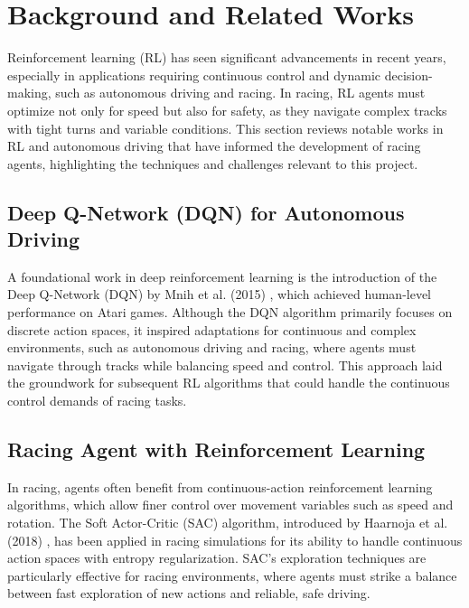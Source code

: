 \documentclass{article}
\begin{document}
\section{Background and Related Works}

Reinforcement learning (RL) has seen significant advancements in recent years, especially in applications requiring continuous control and dynamic decision-making, such as autonomous driving and racing. In racing, RL agents must optimize not only for speed but also for safety, as they navigate complex tracks with tight turns and variable conditions. This section reviews notable works in RL and autonomous driving that have informed the development of racing agents, highlighting the techniques and challenges relevant to this project.

\subsection{Deep Q-Network (DQN) for Autonomous Driving}
A foundational work in deep reinforcement learning is the introduction of the Deep Q-Network (DQN) by Mnih et al. (2015) \cite{mnih2015human}, which achieved human-level performance on Atari games. Although the DQN algorithm primarily focuses on discrete action spaces, it inspired adaptations for continuous and complex environments, such as autonomous driving and racing, where agents must navigate through tracks while balancing speed and control. This approach laid the groundwork for subsequent RL algorithms that could handle the continuous control demands of racing tasks.

\subsection{Racing Agent with Reinforcement Learning}
In racing, agents often benefit from continuous-action reinforcement learning algorithms, which allow finer control over movement variables such as speed and rotation. The Soft Actor-Critic (SAC) algorithm, introduced by Haarnoja et al. (2018) \cite{haarnoja2018soft}, has been applied in racing simulations for its ability to handle continuous action spaces with entropy regularization. SAC’s exploration techniques are particularly effective for racing environments, where agents must strike a balance between fast exploration of new actions and reliable, safe driving.
\end{document}

